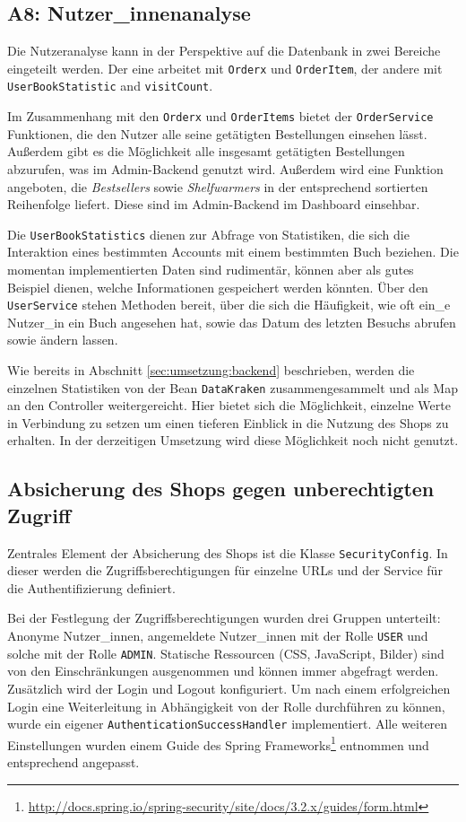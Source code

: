 	\subsection{A8: Nutzer\_innenanalyse}\label{sec:umsetzung:analyse}
	Die Nutzeranalyse kann in der Perspektive auf die Datenbank in zwei Bereiche eingeteilt werden. Der eine arbeitet mit \texttt{Orderx} und \texttt{OrderItem}, der andere mit \texttt{User\-Book\-Statistic} and \texttt{visitCount}.
	
	Im Zusammenhang mit den \texttt{Orderx} und \texttt{OrderItems} bietet der \texttt{OrderService} Funktionen, die den Nutzer alle seine getätigten Bestellungen einsehen lässt. Außerdem gibt es die Möglichkeit alle insgesamt getätigten Bestellungen abzurufen, was im Admin-Backend genutzt wird. Außerdem wird eine Funktion angeboten, die \textit{Bestsellers} sowie \textit{Shelfwarmers} in der entsprechend sortierten Reihenfolge liefert. Diese sind im Admin-Backend im Dashboard einsehbar.
	
	Die \texttt{UserBookStatistics} dienen zur Abfrage von Statistiken, die sich die Interaktion eines bestimmten Accounts mit einem bestimmten Buch beziehen. Die momentan implementierten Daten sind rudimentär, können aber als gutes Beispiel dienen, welche Informationen gespeichert werden könnten. Über den \texttt{UserService} stehen Methoden bereit, über die sich die Häufigkeit, wie oft ein\_e Nutzer\_in ein Buch angesehen hat, sowie das Datum des letzten Besuchs abrufen sowie ändern lassen.
	
	Wie bereits in Abschnitt \ref{sec:umsetzung:backend} beschrieben, werden die einzelnen Statistiken von der Bean \lstinline|DataKraken| zusammengesammelt und als Map an den Controller weitergereicht. Hier bietet sich die Möglichkeit, einzelne Werte in Verbindung zu setzen um einen tieferen Einblick in die Nutzung des Shops zu erhalten. In der derzeitigen Umsetzung wird diese Möglichkeit noch nicht genutzt.
	
	\subsection{Absicherung des Shops gegen unberechtigten Zugriff}\label{sec:umsetzung:absicherung}
	Zentrales Element der Absicherung des Shops ist die Klasse \lstinline|SecurityConfig|. In dieser werden die Zugriffsberechtigungen für einzelne URLs und der Service für die Authentifizierung definiert.
	
	Bei der Festlegung der Zugriffsberechtigungen wurden drei Gruppen unterteilt: Anonyme Nutzer\_innen, angemeldete Nutzer\_innen mit der Rolle \lstinline|USER| und solche mit der Rolle \lstinline|ADMIN|. Statische Ressourcen (CSS, JavaScript, Bilder) sind von den Einschränkungen ausgenommen und können immer abgefragt werden. Zusätzlich wird der Login und Logout konfiguriert. Um nach einem erfolgreichen Login eine Weiterleitung in Abhängigkeit von der Rolle durchführen zu können, wurde ein eigener \lstinline|AuthenticationSuccessHandler| implementiert. Alle weiteren Einstellungen wurden einem Guide des Spring Frameworks\footnote{\hyperlink{http://docs.spring.io/spring-security/site/docs/3.2.x/guides/form.html}{http://docs.spring.io/spring-security/site/docs/3.2.x/guides/form.html}} entnommen und entsprechend angepasst.
	
